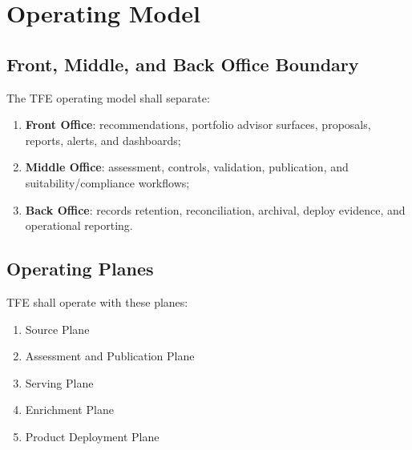 \chapter{Operating Model}
\section{Front, Middle, and Back Office Boundary}

The TFE operating model shall separate:
\begin{enumerate}[leftmargin=1.2cm]
    \item \textbf{Front Office}: recommendations, portfolio advisor surfaces, proposals, reports, alerts, and dashboards;
    \item \textbf{Middle Office}: assessment, controls, validation, publication, and suitability/compliance workflows;
    \item \textbf{Back Office}: records retention, reconciliation, archival, deploy evidence, and operational reporting.
\end{enumerate}

\section{Operating Planes}

TFE shall operate with these planes:
\begin{enumerate}[leftmargin=1.2cm]
    \item Source Plane
    \item Assessment and Publication Plane
    \item Serving Plane
    \item Enrichment Plane
    \item Product Deployment Plane
\end{enumerate}
